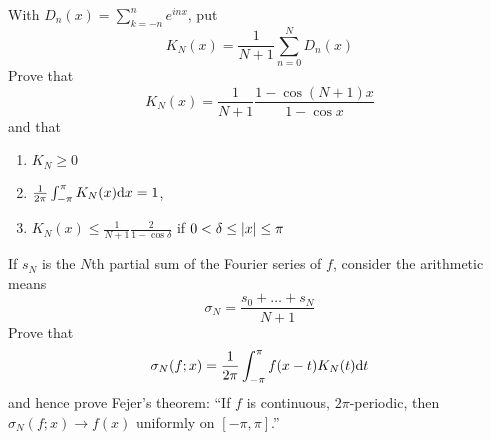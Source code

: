 \documentclass[a4paper, 12pt]{article}
\begin{document}
\begin{problem} 
    With $D_n(x) = \sum_{k=-n}^{n} e^{inx}$, put \begin{equation*}
    K_N(x) = \frac{1}{N+1} \sum_{n=0}^{N} D_n(x)
    \end{equation*}
    Prove that \begin{equation*}
    K_N(x) = \frac{1}{N+1} \frac{1 - \cos (N+1) x}{1 - \cos x}
    \end{equation*}
    and that
    \begin{enumerate}
    \item $K_N \geq 0$
    \item $\frac{1}{2\pi} \int_{-\pi}^{\pi} K_N(x) \mathrm{d} x = 1$,
    \item $K_N(x) \leq \frac{1}{N+1} \frac{2}{1 -\cos \delta}$ if $0 < \delta \leq \lvert x\rvert \leq \pi$
    \end{enumerate}

    If $s_N$ is the $N$th partial sum of the Fourier series of $f$, consider the arithmetic means \begin{equation*}
    \sigma_N = \frac{s_0 + \ldots + s_N}{N+1}
    \end{equation*}
    Prove that \begin{equation*}
    \sigma_N(f; x) = \frac{1}{2\pi} \int_{-\pi}^{\pi} f(x-t) K_N(t) \mathrm{d} t
    \end{equation*}
    and hence prove Fejer's theorem: ``If $f$ is continuous, $2\pi$-periodic, then $\sigma_N(f; x) \to f(x)$ uniformly on $[-\pi, \pi]$.''
\end{problem}
\end{document}
